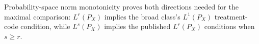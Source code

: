 Probability-space norm monotonicity proves both directions needed for the maximal comparison: \(L^r(P_X)\) implies the broad class's \(L^1(P_X)\) treatment-code condition, while \(L^s(P_X)\) implies the published \(L^r(P_X)\) conditions when \(s\ge r\).